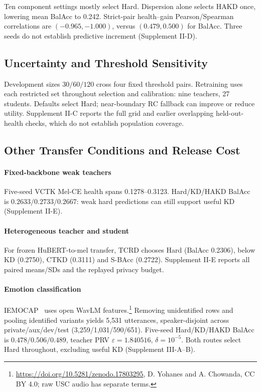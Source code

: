 Ten component settings mostly select Hard. Dispersion alone selects HAKD once, lowering mean BalAcc to 0.242. Strict-pair health--gain Pearson/Spearman correlations are $(-0.965,-1.000)$, versus $(0.479,0.500)$ for BalAcc. Three seeds do not establish predictive increment (Supplement II-D).

\subsection{Uncertainty and Threshold Sensitivity}
\label{sec:uncertainty_results}
Development sizes $30/60/120$ cross four fixed threshold pairs. Retraining uses each restricted set throughout selection and calibration: nine teachers, 27 students. Defaults select Hard; near-boundary RC fallback can improve or reduce utility. Supplement II-C reports the full grid and earlier overlapping held-out-health checks, which do not establish population coverage.

\subsection{Other Transfer Conditions and Release Cost}
\label{sec:cross_dataset}
\paragraph*{Fixed-backbone weak teachers}
Five-seed VCTK Mel-CE health spans 0.1278--0.3123. Hard/KD/HAKD BalAcc is $0.2633/0.2733/0.2667$: weak hard predictions can still support useful KD (Supplement II-E).

\paragraph*{Heterogeneous teacher and student}
For frozen HuBERT-to-mel transfer, TCRD chooses Hard (BalAcc 0.2306), below KD (0.2750), CTKD (0.3111) and S-BAcc (0.2722). Supplement II-E reports all paired means/SDs and the replayed privacy budget.

\paragraph*{Emotion classification}
IEMOCAP~\cite{busso2008iemocap} uses open WavLM features.\footnote{\url{https://doi.org/10.5281/zenodo.17803295}, D. Yohanes and A. Chowanda, CC BY 4.0; raw USC audio has separate terms.} Removing unidentified rows and pooling identified variants yields 5,531 utterances, speaker-disjoint across private/aux/dev/test (3,259/1,031/590/651). Five-seed Hard/KD/HAKD BalAcc is $0.478/0.506/0.489$, teacher PRV $\varepsilon=1.840516$, $\delta=10^{-5}$. Both routes select Hard throughout, excluding useful KD (Supplement III-A--B).

